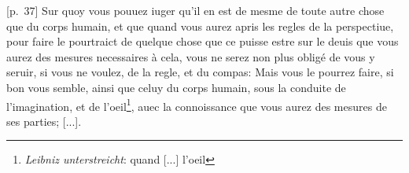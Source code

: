 \pend \vspace{2mm}\pstart {} [p.~37] Sur quoy vous pouuez iuger qu'il en est de mesme de toute autre chose que du corps humain, et que quand vous aurez apris les regles de la perspectiue, pour faire le pourtraict de quelque chose que ce puisse estre sur le deuis que vous aurez des mesures necessaires \`{a} cela, vous ne serez non plus oblig\'{e} de vous y seruir, si vous ne voulez, de la regle, et du compas: Mais vous le pourrez faire, si bon vous semble, ainsi que celuy du corps humain, sous la conduite de l'imagination, et de l'oeil\footnote{\textit{Leibniz unterstreicht}: quand [...] l'oeil}, auec la connoissance que vous aurez des mesures de ses parties; [...].